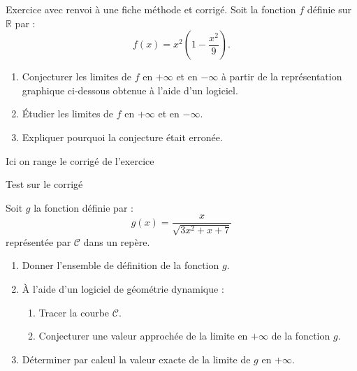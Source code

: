 


\begin{exercice*}\label{exo_test_boite_methode}
Exercice avec renvoi à une fiche méthode et corrigé.
Soit la fonction $f$ définie sur $\mathbb{R}$  par :
\[f(x)= x^2\left(1 - \dfrac{x^2}{9}\right).\]
  \begin{enumerate}
  \item Conjecturer les limites de $f$ en $+\infty$ et en
    $-\infty$ à partir de la représentation graphique ci-dessous obtenue à l'aide d'un logiciel.
  \item Étudier les limites de $f$ en $+\infty$ et en $-\infty$.
  \item Expliquer pourquoi la conjecture était erronée.
  \end{enumerate}
 \begin{corrige}
  Ici on range le corrigé de l'exercice
  
  Test sur le corrigé
\end{corrige}
\end{exercice*}


\begin{exercice}[~\hfill\tice]
  Soit $g$ la fonction définie par :
  \[g(x) = \dfrac{x}{\sqrt{3x^2 + x + 7}}\] représentée par
  $\mathscr{C}$ dans un repère.
  \begin{enumerate}
  \item Donner l'ensemble de définition de la fonction $g$.
  \item À l'aide d'un logiciel de géométrie dynamique :
    \begin{enumerate}
    \item Tracer la courbe $\mathscr{C}$.
    \item Conjecturer une valeur approchée de la limite en $+\infty$
      de la fonction $g$.
    \end{enumerate}
    \item Déterminer par calcul la valeur exacte de
      la limite de $g$ en $+\infty$.
  \end{enumerate}
\end{exercice}

